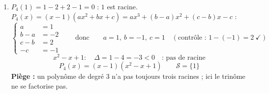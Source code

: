 \begin{enumerate}[itemsep=14pt]
  \item $P_4(1)=1-2+2-1=0$ : $1$ est racine. $P_4(x)=(x-1)(ax^2+bx+c)=ax^3+(b-a)x^2+(c-b)x-c$ :
  \[
  \left\{
  \begin{aligned}
    a&=1\\
    b-a&=-2\\
    c-b&=2\\
    -c&=-1
  \end{aligned}
  \right.
  \qquad\text{donc}\qquad a=1,\ b=-1,\ c=1\quad(\text{contrôle : }1-(-1)=2\ \checkmark)
  \]
  \[x^2-x+1:\quad\Delta=1-4=-3<0\quad\text{: pas de racine}\]
  \[P_4(x)=(x-1)(x^2-x+1)\qquad\mathcal S=\{1\}\]
  \textbf{Piège :} un polynôme de degré $3$ n'a pas toujours trois racines ; ici le trinôme ne se factorise pas.
\end{enumerate}
